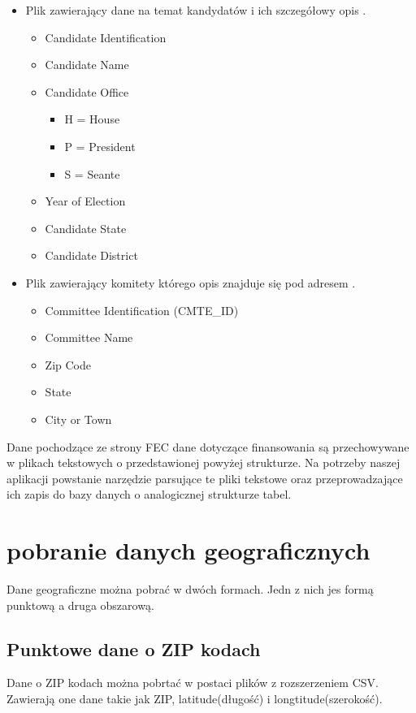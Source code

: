 \documentclass[10pt,a4paper]{article}
\begin{document}
\begin{itemize}
\item Plik zawierający dane na temat kandydatów i ich szczegółowy opis \cite{fecCandMasterFile2015}.

\begin{itemize}
\item Candidate Identification
\item Candidate Name
\item Candidate Office
\begin{itemize}
\item H = House
\item P = President
\item S = Seante
\end{itemize}
\item Year of Election
\item Candidate State
\item Candidate District
\end{itemize}


\item Plik zawierający komitety którego opis znajduje się pod adresem \cite{fecComMasterFile2015}.

\begin{itemize}
\item Committee Identification (CMTE\_ID)
\item Committee Name
\item Zip Code
\item State
\item City or Town
\end{itemize}
\end{itemize}


Dane pochodzące ze strony FEC dane dotyczące finansowania są przechowywane w plikach tekstowych o przedstawionej powyżej strukturze. Na potrzeby naszej aplikacji powstanie narzędzie parsujące te pliki tekstowe oraz przeprowadzające ich zapis do bazy danych o analogicznej strukturze tabel. 
\section{pobranie danych geograficznych}
Dane geograficzne można pobrać w dwóch formach. Jedn z nich jes formą punktową a druga obszarową.
\subsection{Punktowe dane o ZIP kodach}
Dane o ZIP kodach można pobrtać w postaci plików z rozszerzeniem CSV. Zawierają one dane takie jak ZIP, latitude(długość) i longtitude(szerokość).
\end{document}
